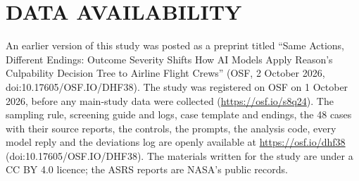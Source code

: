 \documentclass{aer}
\begin{document}
\section*{DATA AVAILABILITY}
An earlier version of this study was posted as a preprint titled ``Same Actions, Different Endings: Outcome Severity Shifts How AI Models Apply Reason's Culpability Decision Tree to Airline Flight Crews'' (OSF, 2 October 2026, doi:10.17605/OSF.IO/DHF38). The study was registered on OSF on 1 October 2026, before any main-study data were collected (\url{https://osf.io/s8q24}). The sampling rule, screening guide and logs, case template and endings, the 48 cases with their source reports, the controls, the prompts, the analysis code, every model reply and the deviations log are openly available at \url{https://osf.io/dhf38} (doi:10.17605/OSF.IO/DHF38). The materials written for the study are under a CC BY 4.0 licence; the ASRS reports are NASA's public records.
\end{document}

